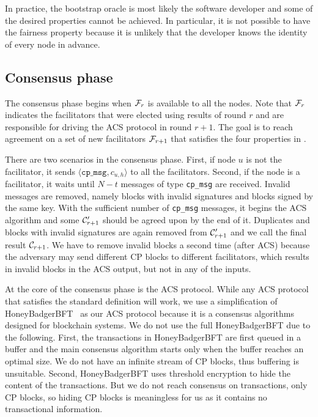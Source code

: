 In practice, the bootstrap oracle is most likely the software developer and some of the desired properties cannot be achieved.
In particular, it is not possible to have the fairness property because it is unlikely that the developer knows the identity of every node in advance.

\subsection{Consensus phase}
\label{sec:consensus-phase}
The consensus phase begins when $\mathcal{F}_r$ is available to all the nodes.
Note that $\mathcal{F}_r$ indicates the facilitators that were elected using results of round $r$ and are responsible for driving the ACS protocol in round $r + 1$.
The goal is to reach agreement on a set of new facilitators $\mathcal{F}_{r + 1}$ that satisfies the four properties in .

There are two scenarios in the consensus phase.
First, if node $u$ is not the facilitator, it sends $\langle \texttt{cp\_msg}, c_{u, h} \rangle$ to all the facilitators.
Second, if the node is a facilitator, it waits until $N - t$ messages of type \texttt{cp\_msg} are received.
Invalid messages are removed, namely blocks with invalid signatures and blocks signed by the same key.
With the sufficient number of \texttt{cp\_msg} messages,
it begins the ACS algorithm and some $\mathcal{C}'_{r + 1}$ should be agreed upon by the end of it.
Duplicates and blocks with invalid signatures are again removed from $\mathcal{C}'_{r+1}$ and we call the final result $\mathcal{C}_{r+1}$.
We have to remove invalid blocks a second time (after ACS) because the adversary may send different CP blocks to different facilitators,
which results in invalid blocks in the ACS output, but not in any of the inputs.

At the core of the consensus phase is the ACS protocol.
While any ACS protocol that satisfies the standard definition will work,
we use a simplification of HoneyBadgerBFT~\cite{miller2016honey} as our ACS protocol
because it is a consensus algorithms designed for blockchain systems.
We do not use the full HoneyBadgerBFT due to the following.
First, the transactions in HoneyBadgerBFT are first queued in a buffer and the main consensus algorithm starts only when the buffer reaches an optimal size.
We do not have an infinite stream of CP blocks, thus buffering is unsuitable.
Second, HoneyBadgerBFT uses threshold encryption to hide the content of the transactions.
But we do not reach consensus on transactions, only CP blocks, so hiding CP blocks is meaningless for us as it contains no transactional information.

